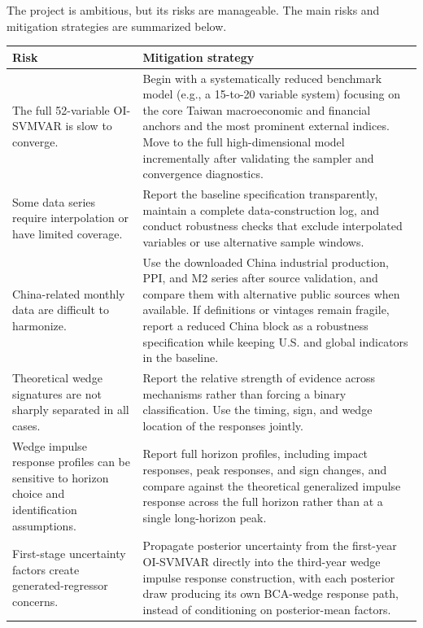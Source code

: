 \documentclass[12pt]{article}
\begin{document}
The project is ambitious, but its risks are manageable. The main risks and mitigation strategies
are summarized below.

\begin{center}
\begin{tabular}{p{}p{}}
\toprule
Risk & Mitigation strategy \\
\midrule
The full 52-variable OI-SVMVAR is slow to converge. &
Begin with a systematically reduced benchmark model (e.g., a 15-to-20 variable system) focusing on the core Taiwan macroeconomic and financial
anchors and the most prominent external indices. Move to the full high-dimensional model incrementally after validating the
sampler and convergence diagnostics. \\
\addlinespace
Some data series require interpolation or have limited coverage. &
Report the baseline specification transparently, maintain a complete data-construction log, and
conduct robustness checks that exclude interpolated variables or use alternative sample windows. \\
\addlinespace
China-related monthly data are difficult to harmonize. &
Use the downloaded China industrial production, PPI, and M2 series after source validation, and
compare them with alternative public sources when available. If definitions or vintages remain
fragile, report a reduced China block as a robustness specification while keeping U.S. and global
indicators in the baseline. \\
\addlinespace
Theoretical wedge signatures are not sharply separated in all cases. &
Report the relative strength of evidence across mechanisms rather than forcing a binary
classification. Use the timing, sign, and wedge location of the responses jointly. \\
\addlinespace
Wedge impulse response profiles can be sensitive to horizon choice and identification assumptions. &
Report full horizon profiles, including impact responses, peak responses, and sign changes, and
compare against the theoretical generalized impulse response across the full horizon rather than
at a single long-horizon peak. \\
\addlinespace
First-stage uncertainty factors create generated-regressor concerns. &
Propagate posterior uncertainty from the first-year OI-SVMVAR directly into the third-year wedge
impulse response construction, with each posterior draw producing its own BCA-wedge response
path, instead of conditioning on posterior-mean factors. \\
\bottomrule
\end{tabular}
\end{center}
\end{document}
